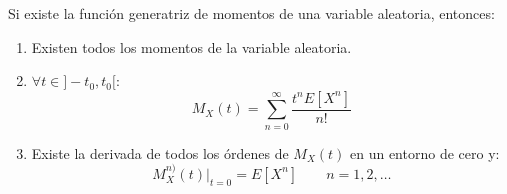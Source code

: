 \begin{teo} 
    Si existe la función generatriz de momentos de una variable aleatoria, entonces:
    \begin{enumerate}
        \item Existen todos los momentos de la variable aleatoria.

        \item $\forall t \in ]-t_0, t_0[$:
        $$M_X(t) = \sum_{n=0}^\infty \dfrac{t^nE[X^n]}{n!}$$

        \item Existe la derivada de todos los órdenes de $M_X(t)$ en un entorno de cero y:
        $$M_X^{n)}(t)\Big|_{t=0} = E[X^n] \qquad n = 1, 2, \ldots$$
    \end{enumerate}
\end{teo}
